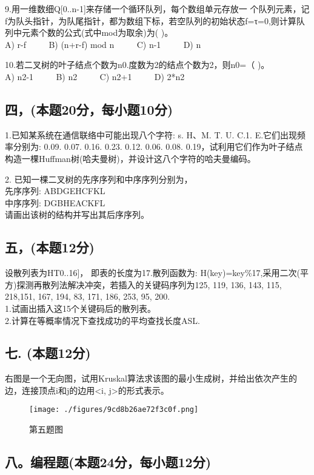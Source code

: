 9.用一维数细Q[0..n-1]来存储一个循环队列，每个数组单元存放一 个队列元素，记f为队头指针，为队尾指针，都为数组下标，若空队列的初始状态f=τ=0,则计算队列中元素个数的公式(式中mod为取余)为( )。 \\
A) r-f $\qquad$ B) (n+r-f) mod n $\qquad$ C) n-1 $\qquad$ D) n

10.若二叉树的叶子结点个数为n0.度数为2的结点个数为2，则n0=（ )。 \\
A) n2-1 $\qquad$ B) n2 $\qquad$ C) n2+1 $\qquad$ D) 2*n2

\subsection{四，(本题20分，每小题10分)}

1.已知某系统在通信联络中可能出现八个字符: s. H、M. T. U. C.1. E.它们出现频率分别为: 0.09. 0.07. 0.16. 0.23. 0.12. 0.06. 0.08. 0.19，试利用它们作为叶子结点构造一棵Huffman树(哈夫曼树)，并设计这八个字符的哈夫曼编码。

2. 已知一棵二叉树的先序序列和中序序列分别为， \\
先序序列: ABDGEHCFKL \\
中序序列: DGBHEACKFL \\
请画出该树的结构并写出其后序序列。

\subsection{五，(本题12分)}
设散列表为HT0..16]， 即表的长度为17.散列函数为: H(key)=key\%17,采用二次(平方)探测再散列法解决冲突，若插入的关键码序列为{125, 119, 136, 143, 115, 218,151, 167, 194, 83, 171, 186, 253, 95, 200}. \\
1.试画出插入这15个关键码后的散列表。 \\
2.计算在等概率情况下查找成功的平均查找长度ASL.

\subsection{七. (本题12分)}
右图是一个无向图，试用Kruskal算法求该图的最小生成树，并给出依次产生的边，连接顶点i和j的边用<i, j>的形式表示。
\begin{figure}[ht]
\centering
\texttt{[image: ./figures/9cd8b26ae72f3c0f.png]}
\caption{第五题图} \label{fig_SMDS12_1}
\end{figure}

\subsection{八。编程题(本题24分，每小题12分)}

